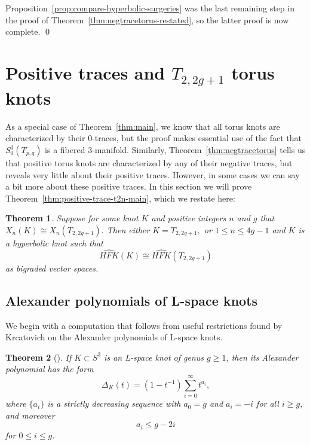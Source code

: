 \documentclass[11pt]{amsart}
\newtheorem {theorem}{Theorem}
\numberwithin{equation}{section}
\numberwithin{theorem}{section}
\theoremstyle{definition}
\newcommand\hfk{\mathit{HFK}}
\newcommand\hfkhat{\widehat{\hfk}}
\begin{document}
Proposition~\ref{prop:compare-hyperbolic-surgeries} was the last remaining step in the proof of Theorem~\ref{thm:negtracetorus-restated}, so the latter proof is now complete. \hfill\qed

%
%
%
%
%

\section{Positive traces and $T_{2,2g+1}$ torus knots} \label{sec:t2n-positive}

As a special case of Theorem~\ref{thm:main}, we know that all torus knots are characterized by their 0-traces, but the proof makes essential use of the fact that $S^3_0(T_{p,q})$ is a fibered 3-manifold.  Similarly, Theorem~\ref{thm:negtracetorus} tells us that positive torus knots are characterized by any of their negative traces, but reveals very little about their positive traces.  However, in some cases we can say a bit more about these positive traces.  In this section we will prove Theorem~\ref{thm:positive-trace-t2n-main}, which we restate here:

\begin{theorem} \label{thm:positive-trace-t2n}
Suppose for some knot $K$ and  positive integers $n$ and $g$ that $X_n(K) \cong X_n(T_{2,2g+1}).$  Then either $K = T_{2,2g+1},$ or   $1 \leq n \leq 4g-1$ and $K$ is a hyperbolic knot such that \[\hfkhat(K) \cong \hfkhat(T_{2,2g+1})\] as bigraded vector spaces.
\end{theorem}


%
%
%

\subsection{Alexander polynomials of L-space knots}

We begin with a computation that follows from useful restrictions found by Krcatovich \cite{krcatovich} on the Alexander polynomials of L-space knots.

\begin{theorem}[{\cite[Theorem~1.6]{krcatovich}}] \label{thm:krcatovich}
If $K \subset S^3$ is an L-space knot of genus $g \geq 1$, then its Alexander polynomial has the form
\begin{equation} \label{eq:krcatovich-lspace}
\Delta_K(t) = (1-t^{-1})\sum_{i=0}^\infty t^{a_i},
\end{equation}
where $\{a_i\}$ is a strictly decreasing sequence with $a_0 = g$ and $a_i=-i$ for all $i \geq g$, and moreover
\[ a_i \leq g-2i \]
for $0 \leq i \leq g$.
\end{theorem}
\end{document}
